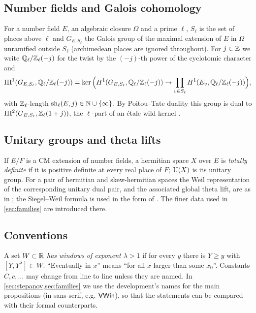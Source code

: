 \subsection{Number fields and Galois cohomology}
For a number field $E$, an algebraic closure $\Omega$ and a prime $\ell$, $S_\ell$ is the set of places
above $\ell$ and $G_{E,S_\ell}$ the Galois group of the maximal extension of $E$ in $\Omega$ unramified
outside $S_\ell$ (archimedean places are ignored throughout). For $j\in\mathbb{Z}$ we write $\mathbb{Q}_\ell/\mathbb{Z}_\ell(-j)$ for the
twist by the $(-j)$-th power of the cyclotomic character and
\[
\mathrm{III}^1(G_{E,S_\ell},\mathbb{Q}_\ell/\mathbb{Z}_\ell(-j))=\ker\Big(H^1(G_{E,S_\ell},\mathbb{Q}_\ell/\mathbb{Z}_\ell(-j))\to\prod_{v\in S_\ell}H^1(E_v,\mathbb{Q}_\ell/\mathbb{Z}_\ell(-j))\Big),
\]
with $\mathbb{Z}_\ell$-length $\mathrm{sh}_\ell(E,j)\in\mathbb{N}\cup\{\infty\}$. By Poitou--Tate duality this group is
dual to $\mathrm{III}^2(G_{E,S_\ell},\mathbb{Z}_\ell(1+j))$, the $\ell$-part of an \'etale wild kernel
\cite{NeukirchSchmidtWingberg2008}.

\subsection{Unitary groups and theta lifts}
If $E/F$ is a CM extension of number fields, a hermitian space $X$ over $E$ is \emph{totally definite}
if it is positive definite at every real place of $F$; $\operatorname{U}(X)$ is its unitary group. For a pair of
hermitian and skew-hermitian spaces the Weil representation of the corresponding unitary dual pair, and
the associated global theta lift, are as in \cite{Howe1989,KudlaRallis1994}; the Siegel--Weil formula is
used in the form of \cite{Weil1965,KudlaRallis1988,Ichino2004}. The finer data used in
\cref{sec:families} are introduced there.

\subsection{Conventions}
A set $W\subset\mathbb{R}$ \emph{has windows of exponent $\lambda>1$} if for every $y$ there is $Y\ge y$ with
$[Y,Y^\lambda]\subset W$. ``Eventually in $x$'' means ``for all $x$ larger than some $x_0$''. Constants
$C,c,\dots$ may change from line to line unless they are named. In \cref{sec:stepanov,sec:families}
we use the development's names for the main propositions (in sans-serif, e.g. $\mathsf{VWin}$), so that
the statements can be compared with their formal counterparts.
